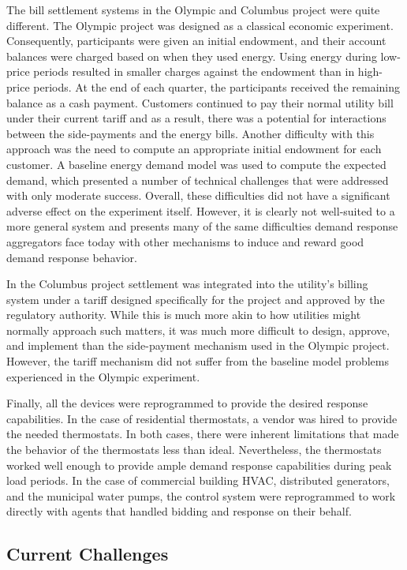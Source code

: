 \documentclass[10pt,twocolumn]{article}
\begin{document}
The bill settlement systems in the Olympic and Columbus project were quite different.  The Olympic project was designed as a classical economic experiment.  Consequently, participants were given an initial endowment, and their account balances were charged based on when they used energy. Using energy during low-price periods resulted in smaller charges against the endowment than in high-price periods. At the end of each quarter, the participants received the remaining balance as a cash payment. Customers continued to pay their normal utility bill under their current tariff and as a result, there was a potential for interactions between the side-payments and the energy bills.  Another difficulty with this approach was the need to compute an appropriate initial endowment for each customer.  A baseline energy demand model was used to compute the expected demand, which presented a number of technical challenges that were addressed with only moderate success.  Overall, these difficulties did not have a significant adverse effect on the experiment itself. However, it is clearly not well-suited to a more general system and presents many of the same difficulties demand response aggregators face today with other mechanisms to induce and reward good demand response behavior.

In the Columbus project settlement was integrated into the utility's billing system under a tariff designed specifically for the project and approved by the regulatory authority. While this is much more akin to how utilities might normally approach such matters, it was much more difficult to design, approve, and implement than the side-payment mechanism used in the Olympic project.  However, the tariff mechanism did not suffer from the baseline model problems experienced in the Olympic experiment.

Finally, all the devices were reprogrammed to provide the desired response capabilities. In the case of residential thermostats, a vendor was hired to provide the needed thermostats.  In both cases, there were inherent limitations that made the behavior of the thermostats less than ideal. Nevertheless, the thermostats worked well enough to provide ample demand response capabilities during peak load periods.  In the case of commercial building HVAC, distributed generators, and the municipal water pumps, the control system were reprogrammed to work directly with agents that handled bidding and response on their behalf.

\subsection{Current Challenges}
\end{document}
